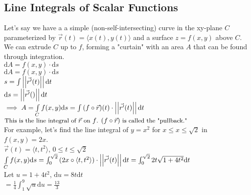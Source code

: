 \subsection{Line Integrals of Scalar Functions}
\noindent
Let's say we have a a simple (non-self-intersecting) curve in the xy-plane $C$ parameterized by $\vec{r}(t) = \langle x(t), y(t)\rangle$ and a surface $z = f(x,y)$ above $C$. We can extrude $C$ up to $f$, forming a "curtain" with an area $A$ that can be found through integration.\\
\indent
$\mathrm{d}A = f(x,y) \cdot \mathrm{d}s$\\
\indent
$\mathrm{d}A = f(x,y) \cdot \mathrm{d}s$\\
\indent
$s = \int{\left|\left|\vec{r^\prime}(t)\right|\right|\mathrm{d}t}$\\
\indent
$\mathrm{d}s = \left|\left|\vec{r^\prime}()\right|\right|\mathrm{d}t$\\
\indent
$\implies A = \int\limits_{C}{f(x,y)\mathrm{d}s} = \int{(f\circ\vec{r})(t) \cdot \left|\left|\vec{r^\prime}(t)\right|\right|\mathrm{d}t}$\\
\indent
$\small{\text{This is the line integral of }\vec{r}\text{ on }f\text{. }(f\circ\vec{r})\text{ is called the "pullback."}}$\\

\noindent
For example, let's find the line integral of $y = x^2$ for $x \leq x \leq \sqrt{2}$ in $f(x,y) = 2x$.\\
\indent
$\vec{r}(t) = \langle t, t^2 \rangle$, $0 \leq t \leq \sqrt{2}$\\
\indent
$\int\limits_{C}{f(x,y)\mathrm{d}s} = \int_{0}^{\sqrt{2}}{(2x \circ \langle t, t^2\rangle) \cdot \left|\left|\vec{r^\prime}(t)\right|\right|\mathrm{d}t} = \int_{0}^{\sqrt{2}}{2t\sqrt{1 + 4t^2}\mathrm{d}t}$\\
\indent
Let $u = 1+4t^2$, $\mathrm{d}u = 8t\mathrm{d}t$\\
\indent
$= \frac{1}{4}\int_{1}^{9}{\sqrt{u}\mathrm{d}u} = \frac{13}{3}$